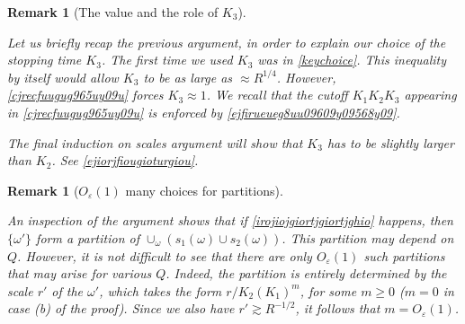 \documentclass{amsart}%
\numberwithin{equation}{section}
\newtheorem{remark}[theorem]{Remark}
\newcommand{\e}{\varepsilon}
\newcommand{\1}{\mathbbm{1}}
\begin{document}
	
	\begin{remark}[The value and the role of $K_3$]
    \label{remark-K-3}
    \rm 
    
	Let us briefly recap the previous argument, in order to explain our choice of the stopping time $K_3$. The first time we used $K_3$ was in \eqref{keychoice}. This inequality by itself would allow $K_3$ to be as large as $\approx R^{1/4}$. However, \eqref{cjrecfuugug965uy09u}	forces $K_3\approx 1$. We recall that the cutoff $K_1K_2K_3$ appearing in \eqref{cjrecfuugug965uy09u} is enforced by \eqref{ejfirueueg8uu09609y09568y09}.
	
	The final induction on scales argument will show that $K_3$ has to be slightly larger than $K_2$. See \eqref{ejiorjfiougioturgiou}.
	\end{remark}
    
	\begin{remark}[$O_\e(1)$ many choices for partitions]
	\label{poi5tu549u5609ug09uy09}
    \rm
		
		
	An inspection of the argument shows  that if \eqref{irojiojgiortjgiortjghio}	happens, then $\{\omega'\}$ form a partition of $\cup_{\omega}(s_1(\omega)\cup s_2(\omega))$. This partition may depend on $Q$. However, it is not difficult to see that there are only $O_\e(1)$ such partitions that may arise for various $Q$. Indeed, the partition is entirely determined by the scale $r'$ of the $\omega'$, which takes the form $r/K_2(K_1)^m$, for some $m\ge 0$ ($m=0$ in case (b) of the proof). Since we also have $r'\gtrsim R^{-1/2}$, it follows that $m=O_\e(1)$.
	\end{remark}
    
\end{document}
